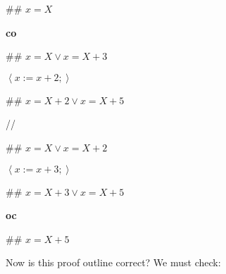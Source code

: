\documentclass[11pt]{article}%
\begin{document}
\begin{code}
\#\# $x=X$

\textbf{co}

\begin{indent}
\item \#\# $x=X\vee x=X+3$

\item $\left\langle x:=x+2;\right\rangle $

\item \#\# $x=X+2\vee x=X+5$
\end{indent}

//

\begin{indent}
\item \#\# $x=X\vee x=X+2$

\item $\left\langle x:=x+3;\right\rangle $

\item \#\# $x=X+3\vee x=X+5$
\end{indent}

\textbf{oc}

\#\# $x=X+5$
\end{code}

Now is this proof outline correct? We must check:
\end{document}
